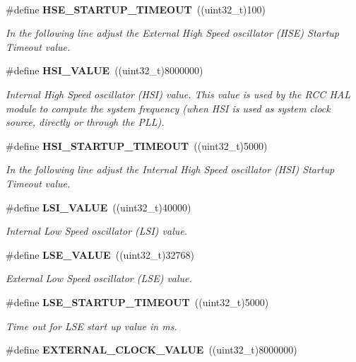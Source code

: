 \begin{DoxyCompactItemize}
\begin{DoxyCompactList}
~\newline
 \end{DoxyCompactList}\item 
\#define \textbf{ H\+S\+E\+\_\+\+S\+T\+A\+R\+T\+U\+P\+\_\+\+T\+I\+M\+E\+O\+UT}~((uint32\+\_\+t)100)
\begin{DoxyCompactList}\small\item\em In the following line adjust the External High Speed oscillator (H\+SE) Startup Timeout value. \end{DoxyCompactList}\item 
\#define \textbf{ H\+S\+I\+\_\+\+V\+A\+L\+UE}~((uint32\+\_\+t)8000000)
\begin{DoxyCompactList}\small\item\em Internal High Speed oscillator (H\+SI) value. This value is used by the R\+CC H\+AL module to compute the system frequency (when H\+SI is used as system clock source, directly or through the P\+LL). \end{DoxyCompactList}\item 
\#define \textbf{ H\+S\+I\+\_\+\+S\+T\+A\+R\+T\+U\+P\+\_\+\+T\+I\+M\+E\+O\+UT}~((uint32\+\_\+t)5000)
\begin{DoxyCompactList}\small\item\em In the following line adjust the Internal High Speed oscillator (H\+SI) Startup Timeout value. \end{DoxyCompactList}\item 
\#define \textbf{ L\+S\+I\+\_\+\+V\+A\+L\+UE}~((uint32\+\_\+t)40000)
\begin{DoxyCompactList}\small\item\em Internal Low Speed oscillator (L\+SI) value. \end{DoxyCompactList}\item 
\#define \textbf{ L\+S\+E\+\_\+\+V\+A\+L\+UE}~((uint32\+\_\+t)32768)
\begin{DoxyCompactList}\small\item\em External Low Speed oscillator (L\+SE) value. \end{DoxyCompactList}\item 
\#define \textbf{ L\+S\+E\+\_\+\+S\+T\+A\+R\+T\+U\+P\+\_\+\+T\+I\+M\+E\+O\+UT}~((uint32\+\_\+t)5000)
\begin{DoxyCompactList}\small\item\em Time out for L\+SE start up value in ms. \end{DoxyCompactList}\item 
\#define \textbf{ E\+X\+T\+E\+R\+N\+A\+L\+\_\+\+C\+L\+O\+C\+K\+\_\+\+V\+A\+L\+UE}~((uint32\+\_\+t)8000000)

\end{DoxyCompactItemize}
